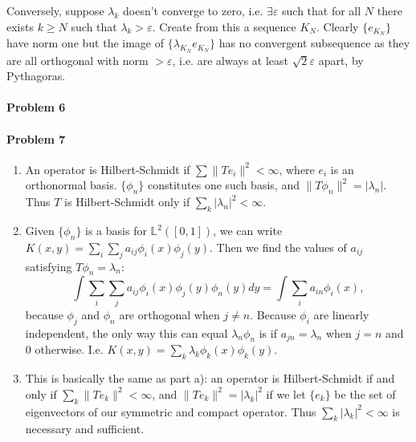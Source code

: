 \documentclass[12pt]{article}
\begin{document}
Conversely, suppose $\lambda_k$ doesn't converge to zero, i.e. $\exists
\varepsilon$ such that for all $N$ there exists $k \geq N$ such that $\lambda_k
> \varepsilon$. Create from this a sequence $K_N$. Clearly $\{e_{K_N}\}$ have
norm one but the image of $\{\lambda_{K_N}e_{K_N}\}$ has no convergent
subsequence
as they are all orthogonal with norm $> \varepsilon$, i.e. are always at least
$\sqrt{2}\varepsilon$ apart, by Pythagoras.

\paragraph{Problem 6}

\paragraph{Problem 7}
\begin{enumerate}[label=\alph*)]
\item An operator is Hilbert-Schmidt if $\sum\|Te_i\|^2 < \infty$, where $e_i$
  is an orthonormal basis. $\{\phi_n\}$ constitutes one such basis, and
  $\|T\phi_n\|^2 = |\lambda_n|$. Thus $T$ is Hilbert-Schmidt only if
  $\sum_k|\lambda_n|^2 < \infty$.
\item Given $\{\phi_n\}$ is a basis for $\mathbb{L}^2([0,1])$, we can write
  $K(x,y) = \sum_i\sum_ja_{ij}\phi_i(x)\phi_j(y)$. Then we find the values of
  $a_{ij}$ satisfying $T\phi_n = \lambda_n$:
  \begin{displaymath}
    \int\sum_i\sum_ja_{ij}\phi_i(x)\phi_j(y)\phi_n(y)dy
    = \int\sum_ia_{in}\phi_i(x),
  \end{displaymath}
  because $\phi_j$ and $\phi_n$ are orthogonal when $j\neq n$. Because $\phi_i$
  are linearly independent, the only way this can equal $\lambda_n\phi_n$ is if
  $a_{jn} =\lambda_n$ when $j=n$ and 0 otherwise. I.e. $K(x,y) = \sum_k
  \lambda_k\phi_k(x)\phi_k(y)$.
\item This is basically the same as part a): an operator is Hilbert-Schmidt if
  and only if $\sum_k\|Te_k\|^2 < \infty$, and $\|Te_k\|^2 = |\lambda_k|^2$ if
  we let $\{e_k\}$ be the set of eigenvectors of our symmetric and compact
  operator. Thus $\sum_k|\lambda_k|^2 < \infty$ is necessary and sufficient.
  

\end{enumerate}
\end{document}
